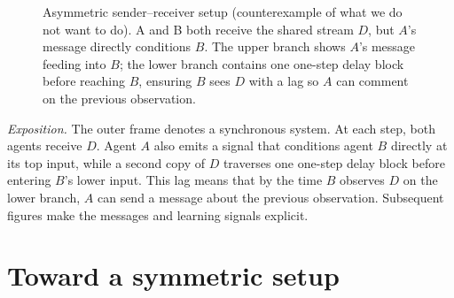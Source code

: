 \documentclass{article}
\theoremstyle{definition}
\begin{document}
\bigskip
\begin{figure}[H]
\begin{center}
\end{center}
\caption{Asymmetric sender--receiver setup (counterexample of what we do not want to do). A and B both receive the shared stream $D$, but $A$'s message directly conditions $B$. The upper branch shows $A$'s message feeding into $B$; the lower branch contains one one-step delay block before reaching $B$, ensuring $B$ sees $D$ with a lag so $A$ can comment on the previous observation.}
\end{figure}

\noindent\textit{Exposition.} The outer frame denotes a synchronous system. At each step, both agents receive $D$. Agent $A$ also emits a signal that conditions agent $B$ directly at its top input, while a second copy of $D$ traverses one one-step delay block before entering $B$'s lower input. This lag means that by the time $B$ observes $D$ on the lower branch, $A$ can send a message about the previous observation. Subsequent figures make the messages and learning signals explicit.

\section{Toward a symmetric setup}
\end{document}

